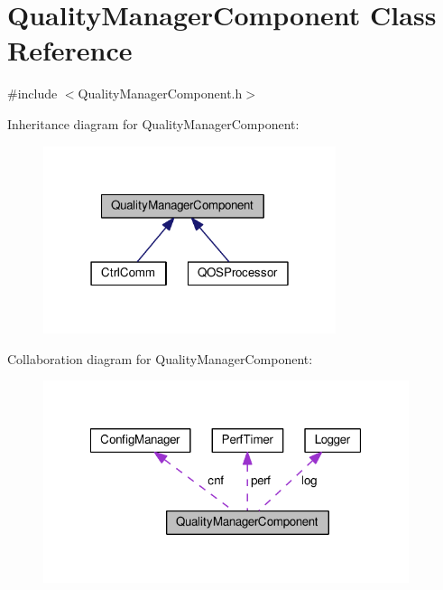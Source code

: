 \hypertarget{classQualityManagerComponent}{}\section{Quality\+Manager\+Component Class Reference}
\label{classQualityManagerComponent}


{\ttfamily \#include $<$Quality\+Manager\+Component.\+h$>$}



Inheritance diagram for Quality\+Manager\+Component\+:
\nopagebreak
\begin{figure}[H]
\begin{center}
\leavevmode
\includegraphics[width=243pt]{classQualityManagerComponent__inherit__graph}
\end{center}
\end{figure}


Collaboration diagram for Quality\+Manager\+Component\+:
\nopagebreak
\begin{figure}[H]
\begin{center}
\leavevmode
\includegraphics[width=304pt]{classQualityManagerComponent__coll__graph}
\end{center}
\end{figure}
